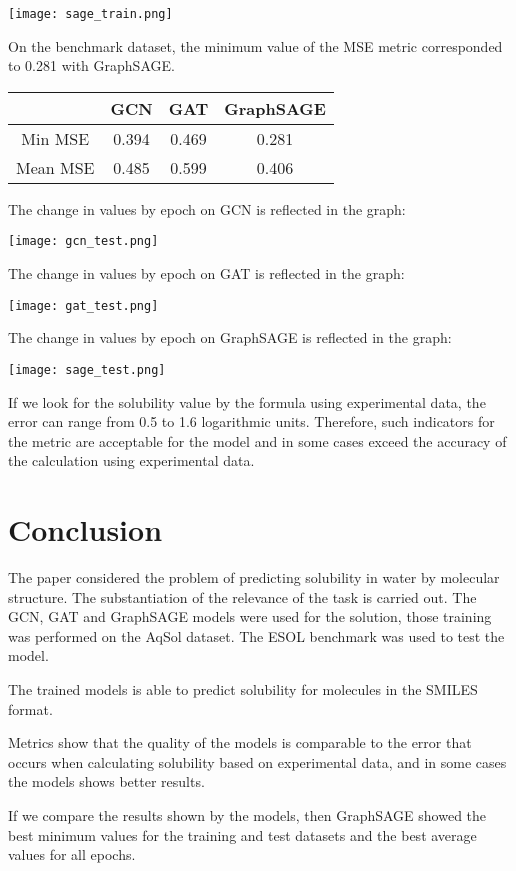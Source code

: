 \documentclass[a4paper,14pt]{article}
\begin{document}
\texttt{[image: sage\_train.png]}

On the benchmark dataset, the minimum value of the MSE metric corresponded to 0.281 with GraphSAGE. 
\begin{center}
\begin{tabular}{ |c|c|c|c| }
\hline
  & GCN & GAT & GraphSAGE \\ 
 \hline
 Min MSE & 0.394 & 0.469 & 0.281 \\  
 \hline
 Mean MSE & 0.485 & 0.599 &  0.406  \\
 \hline
\end{tabular}
\end{center}
The change in values by epoch on GCN is reflected in the graph:

\texttt{[image: gcn\_test.png]}

The change in values by epoch on GAT is reflected in the graph:

\texttt{[image: gat\_test.png]}

The change in values by epoch on GraphSAGE is reflected in the graph:

\texttt{[image: sage\_test.png]}

If we look for the solubility value by the formula using experimental data, the error can range from 0.5 to 1.6 logarithmic units. Therefore, such indicators for the metric are acceptable for the model and in some cases exceed the accuracy of the calculation using experimental data.

\section{Conclusion}
The paper considered the problem of predicting solubility in water by molecular structure. The substantiation of the relevance of the task is carried out. The GCN, GAT and GraphSAGE models were used for the solution, those training was performed on the AqSol dataset. The ESOL benchmark was used to test the model.

The trained models is able to predict solubility for molecules in the SMILES format.

Metrics show that the quality of the models is comparable to the error that occurs when calculating solubility based on experimental data, and in some cases the models shows better results.

If we compare the results shown by the models, then GraphSAGE showed the best minimum values for the training and test datasets and the best average values for all epochs.
\end{document}
